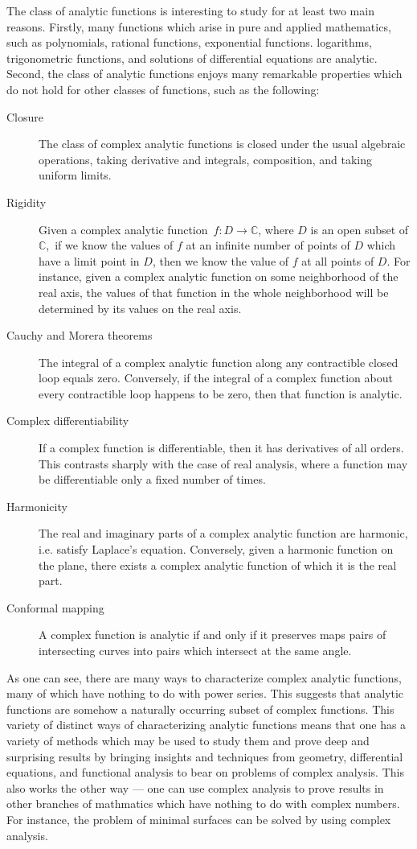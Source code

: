 \documentclass[12pt]{article}
\theoremstyle{definition}
\begin{document}
The class of analytic functions is interesting
to study for at least two main reasons.  Firstly,
many functions which arise in pure and applied
mathematics, such as polynomials, rational functions,
exponential functions. logarithms, trigonometric
functions, and solutions of differential equations
are analytic.  Second, the class of analytic functions
enjoys many remarkable properties which do not hold
for other classes of functions, such as the following:
\begin{description}
\item[Closure]  The class of complex analytic functions 
is closed under the usual algebraic operations,
taking derivative and integrals, composition,
and taking uniform limits.
\item[Rigidity]  Given a complex analytic function\,
$f \colon D \to \mathbb{C}$, where $D$ is
an open subset of $\mathbb{C}$,\, if we know the
values of $f$ at an infinite number of points of
$D$ which have a limit point in $D$, then we 
know the value of $f$ at all points of $D$.  For
instance, given a complex analytic function on
some neighborhood of the real axis, the values
of that function in the whole neighborhood will
be determined by its values on the real axis.
\item[Cauchy and Morera theorems]  The integral of a 
complex analytic function along any contractible
closed loop equals zero.  Conversely, if the integral
of a complex function about every contractible loop 
happens to be zero, then that function is analytic.
\item[Complex differentiability]  If a complex
function is differentiable, then it has derivatives
of all orders.  This contrasts sharply with the
case of real analysis, where a function may be
differentiable only a fixed number of times.
\item[Harmonicity]  The real and imaginary parts
of a complex analytic function are harmonic, i.e.
satisfy Laplace's equation.  Conversely, given a
harmonic function on the plane, there exists a
complex analytic function of which it is the real
part.
\item[Conformal mapping]  A complex function is
analytic if and only if it preserves maps pairs
of intersecting curves into pairs which intersect 
at the same angle.
\end{description}
As one can see, there are many ways to characterize
complex analytic functions, many of which have
nothing to do with power series.  This suggests that
analytic functions are somehow a naturally occurring
subset of complex functions.  This variety of distinct
ways of characterizing analytic functions means that
one has a variety of methods which may be used to
study them and prove deep and surprising results
by bringing insights and techniques from geometry,
differential equations, and functional analysis to
bear on problems of complex analysis.  This also
works the other way --- one can use complex analysis
to prove results in other branches of mathmatics 
which have nothing to do with complex numbers.  For
instance, the problem of minimal surfaces can be
solved by using complex analysis.
\end{document}
